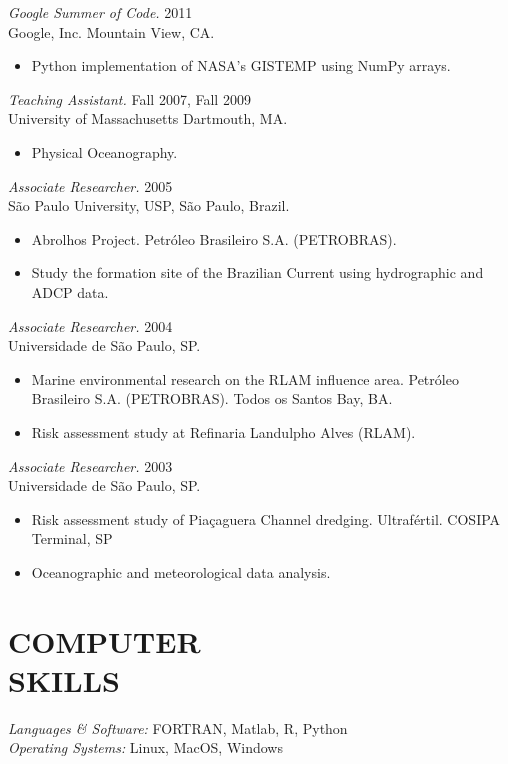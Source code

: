 \documentclass[line,margin]{res}
\begin{document}
\begin{resume}
{\sl Google Summer of Code.} \hfill 2011 \\
Google, Inc. Mountain View, CA.
\begin{itemize}  \itemsep -2pt
\item Python implementation of NASA's GISTEMP using NumPy arrays.
\end{itemize}

{\sl Teaching Assistant.} \hfill Fall 2007, Fall 2009\\
University of Massachusetts Dartmouth, MA.
\begin{itemize}  \itemsep -2pt
\item Physical Oceanography.
\end{itemize}

{\sl Associate Researcher.} \hfill 2005\\
São Paulo University, USP, São Paulo, Brazil. \\
\begin{itemize}  \itemsep -2pt
  \item Abrolhos Project. Petróleo Brasileiro S.A. (PETROBRAS).
  \item Study the formation site of the Brazilian Current using
        hydrographic and ADCP data.
\end{itemize}

{\sl Associate Researcher.} \hfill 2004\\
Universidade de São Paulo, SP.
\begin{itemize}  \itemsep -2pt
  \item Marine environmental research on the RLAM influence area. Petróleo
        Brasileiro S.A. (PETROBRAS). Todos os Santos Bay, BA.
  \item Risk assessment study at Refinaria Landulpho Alves (RLAM).
\end{itemize}

{\sl Associate Researcher.} \hfill 2003\\
Universidade de São Paulo, SP.
\begin{itemize}  \itemsep -2pt
  \item Risk assessment study of Piaçaguera Channel dredging. Ultrafértil.
        COSIPA Terminal, SP
  \item Oceanographic and meteorological data analysis.
\end{itemize}

\section{COMPUTER \\ SKILLS}
{\sl Languages \& Software:} FORTRAN, Matlab, R, Python\\
{\sl Operating Systems:} Linux, MacOS, Windows


\end{resume}
\end{document}
